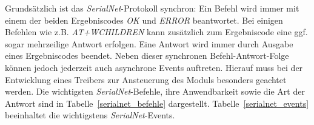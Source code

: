                 Grundsätzlich ist das \emph{SerialNet}-Protokoll synchron: Ein Befehl wird immer mit einem der beiden 
                Ergebniscodes \emph{OK} und \emph{ERROR} beantwortet. Bei einigen Befehlen wie z.B. \emph{AT+WCHILDREN}
                kann zusätzlich zum Ergebniscode eine ggf. sogar mehrzeilige Antwort erfolgen. Eine Antwort wird immer
                durch Ausgabe eines Ergebniscodes beendet. Neben dieser synchronen Befehl-Antwort-Folge können jedoch
                jederzeit auch asynchrone Events auftreten. Hierauf muss bei der Entwicklung eines Treibers zur 
                Ansteuerung des Moduls besonders geachtet werden. Die wichtigsten \emph{SerialNet}-Befehle, ihre
                Anwendbarkeit sowie die Art der Antwort sind in Tabelle~\ref{serialnet_befehle} dargestellt.
                Tabelle~\ref{serialnet_events} beeinhaltet die wichtigstens \emph{SerialNet}-Events.

